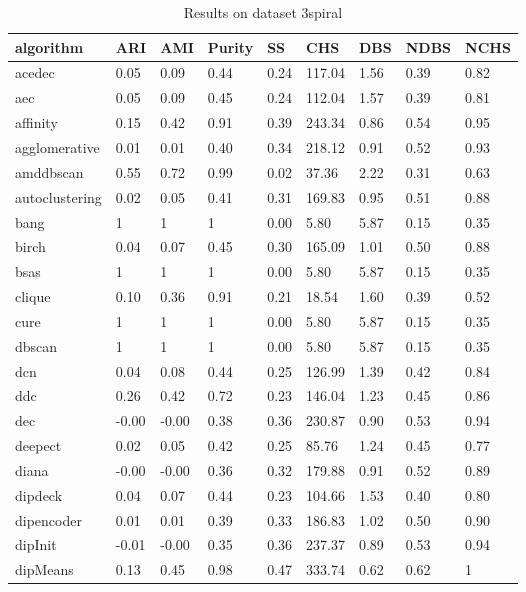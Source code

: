 \begin{table}[H]
\centering
\caption{Results on dataset 3spiral}
\label{S53_Table}
\begin{tabular}{|l|l|l|l|l|l|l|l|l|}
\hline
algorithm & ARI & AMI & Purity & SS & CHS & DBS & NDBS & NCHS \\
\hline
acedec & 0.05 & 0.09 & 0.44 & 0.24 & 117.04 & 1.56 & 0.39 & 0.82 \\
\hline
aec & 0.05 & 0.09 & 0.45 & 0.24 & 112.04 & 1.57 & 0.39 & 0.81 \\
\hline
affinity & 0.15 & 0.42 & 0.91 & 0.39 & 243.34 & 0.86 & 0.54 & 0.95 \\
\hline
agglomerative & 0.01 & 0.01 & 0.40 & 0.34 & 218.12 & 0.91 & 0.52 & 0.93 \\
\hline
amddbscan & 0.55 & 0.72 & 0.99 & 0.02 & 37.36 & 2.22 & 0.31 & 0.63 \\
\hline
autoclustering & 0.02 & 0.05 & 0.41 & 0.31 & 169.83 & 0.95 & 0.51 & 0.88 \\
\hline
bang & 1 & 1 & 1 & 0.00 & 5.80 & 5.87 & 0.15 & 0.35 \\
\hline
birch & 0.04 & 0.07 & 0.45 & 0.30 & 165.09 & 1.01 & 0.50 & 0.88 \\
\hline
bsas & 1 & 1 & 1 & 0.00 & 5.80 & 5.87 & 0.15 & 0.35 \\
\hline
clique & 0.10 & 0.36 & 0.91 & 0.21 & 18.54 & 1.60 & 0.39 & 0.52 \\
\hline
cure & 1 & 1 & 1 & 0.00 & 5.80 & 5.87 & 0.15 & 0.35 \\
\hline
dbscan & 1 & 1 & 1 & 0.00 & 5.80 & 5.87 & 0.15 & 0.35 \\
\hline
dcn & 0.04 & 0.08 & 0.44 & 0.25 & 126.99 & 1.39 & 0.42 & 0.84 \\
\hline
ddc & 0.26 & 0.42 & 0.72 & 0.23 & 146.04 & 1.23 & 0.45 & 0.86 \\
\hline
dec & -0.00 & -0.00 & 0.38 & 0.36 & 230.87 & 0.90 & 0.53 & 0.94 \\
\hline
deepect & 0.02 & 0.05 & 0.42 & 0.25 & 85.76 & 1.24 & 0.45 & 0.77 \\
\hline
diana & -0.00 & -0.00 & 0.36 & 0.32 & 179.88 & 0.91 & 0.52 & 0.89 \\
\hline
dipdeck & 0.04 & 0.07 & 0.44 & 0.23 & 104.66 & 1.53 & 0.40 & 0.80 \\
\hline
dipencoder & 0.01 & 0.01 & 0.39 & 0.33 & 186.83 & 1.02 & 0.50 & 0.90 \\
\hline
dipInit & -0.01 & -0.00 & 0.35 & 0.36 & 237.37 & 0.89 & 0.53 & 0.94 \\
\hline
dipMeans & 0.13 & 0.45 & 0.98 & 0.47 & 333.74 & 0.62 & 0.62 & 1 \\

\end{tabular}
\end{table}

